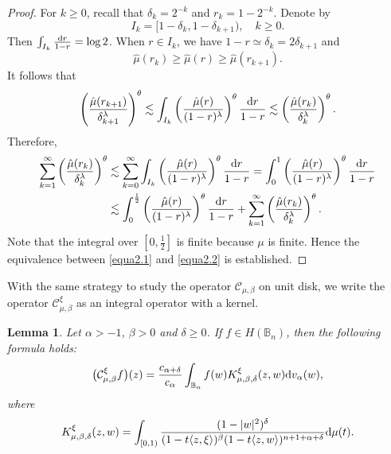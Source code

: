 \documentclass[preprint,12pt,times]{elsarticle}
\newtheorem{lemma}[theorem]{Lemma}
\theoremstyle{definition}
\theoremstyle{remark}
\numberwithin{equation}{section}
\begin{document}
\begin{proof}
For $k\geq 0$, recall that $\delta_k=2^{-k}$ and $r_k=1-2^{-k}$.
Denote by 
\[
    I_k=[1-\delta_k,1-\delta_{k+1}),\quad k\geq 0.
\]
Then $\int_{I_k}\frac{{\rm d}r}{1-r}=\log 2$. When $r\in I_k$, we have $1-r\simeq \delta_k=2\delta_{k+1}$ and 
\[
    \hat{\mu}(r_k)\geq \hat{\mu}(r)\geq \hat{\mu}(r_{k+1}).
\]
It follows that
\begin{equation*}
\left(\frac{\hat{\mu}(r_{k+1})}{\delta_{k+1}^{\lambda}}\right)^{\theta}\lesssim \int_{I_k}\left(\frac{\hat{\mu}(r)}{(1-r)^{\lambda}}\right)^{\theta}\frac{{\rm d}r}{1-r}\lesssim \left(\frac{\hat{\mu}(r_k)}{\delta_k^{\lambda}}\right)^{\theta}.
\end{equation*}
Therefore,
\begin{align*}
\sum_{k=1}^{\infty}\left(\frac{\hat{\mu}(r_k)}{\delta_k^{\lambda}}\right)^{\theta}&\lesssim \sum_{k=0}^{\infty}\int_{I_k}\left(\frac{\hat{\mu}(r)}{(1-r)^{\lambda}}\right)^{\theta}\frac{{\rm d}r}{1-r}=\int_{0}^1\left(\frac{\hat{\mu}(r)}{(1-r)^{\lambda}}\right)^{\theta}\frac{{\rm d}r}{1-r}\\
&\lesssim \int_{0}^{\frac{1}{2}}\left(\frac{\hat{\mu}(r)}{(1-r)^{\lambda}}\right)^{\theta}\frac{{\rm d}r}{1-r}+\sum_{k=1}^{\infty}\left(\frac{\hat{\mu}(r_k)}{\delta_k^{\lambda}}\right)^{\theta}.
\end{align*}
Note that the integral over $[0,\frac{1}{2}]$ is finite because $\mu$ is finite. Hence the equivalence between \eqref{equa2.1} and \eqref{equa2.2} is established.
\end{proof}


With the same strategy to study the operator $\mathcal C_{\mu,\beta}$ on unit disk, we write the operator $\mathcal{C}_{\mu,\beta}^{\xi}$ as an integral operator with a kernel.

\begin{lemma}\label{lemmaKR}
Let $\alpha>-1$, $\beta>0$ and $\delta\geq 0$. If $f\in H(\mathbb B_n)$, then the following formula holds:
\begin{equation}\label{equa2.3}
    \big(\mathcal{C}_{\mu,\beta}^{\xi}f\big)(z)=\frac{c_{\alpha+\delta}}{c_{\alpha}}\int_{\mathbb{B}_n}f(w)K_{\mu,\beta,\delta}^{\xi}(z,w){\rm d}v_{\alpha}(w),
\end{equation}
where 
\begin{equation}\label{equa2.4}
K_{\mu,\beta,\delta}^{\xi}(z,w)=\int_{[0,1)}\frac{(1-|w|^2)^{\delta}}{(1-t\langle z,\xi\rangle)^{\beta}(1-t\langle z,w\rangle)^{n+1+\alpha+\delta}}{\rm d}\mu(t).
\end{equation}
\end{lemma}
\end{document}
